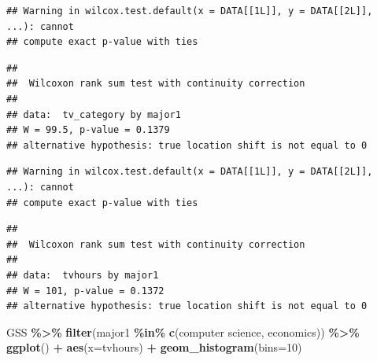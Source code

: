 \documentclass[
]{book}
\newenvironment{Shaded}{\begin{snugshade}}{\end{snugshade}}
\newcommand{\AttributeTok}[1]{\textcolor[rgb]{0.13,0.29,0.53}{#1}}
\newcommand{\DecValTok}[1]{\textcolor[rgb]{0.00,0.00,0.81}{#1}}
\newcommand{\FunctionTok}[1]{\textcolor[rgb]{0.13,0.29,0.53}{\textbf{#1}}}
\newcommand{\NormalTok}[1]{#1}
\newcommand{\SpecialCharTok}[1]{\textcolor[rgb]{0.81,0.36,0.00}{\textbf{#1}}}
\newcommand{\StringTok}[1]{\textcolor[rgb]{0.31,0.60,0.02}{#1}}
\theoremstyle{definition}
\theoremstyle{definition}
\theoremstyle{definition}
\theoremstyle{definition}
\theoremstyle{remark}
\begin{document}
\begin{verbatim}
## Warning in wilcox.test.default(x = DATA[[1L]], y = DATA[[2L]], ...): cannot
## compute exact p-value with ties
\end{verbatim}

\begin{verbatim}
## 
##  Wilcoxon rank sum test with continuity correction
## 
## data:  tv_category by major1
## W = 99.5, p-value = 0.1379
## alternative hypothesis: true location shift is not equal to 0
\end{verbatim}

\begin{Shaded}
\end{Shaded}

\begin{verbatim}
## Warning in wilcox.test.default(x = DATA[[1L]], y = DATA[[2L]], ...): cannot
## compute exact p-value with ties
\end{verbatim}

\begin{verbatim}
## 
##  Wilcoxon rank sum test with continuity correction
## 
## data:  tvhours by major1
## W = 101, p-value = 0.1372
## alternative hypothesis: true location shift is not equal to 0
\end{verbatim}

\begin{Shaded}
\begin{Highlighting}[]
\NormalTok{GSS }\SpecialCharTok{\%\textgreater{}\%} 
  \FunctionTok{filter}\NormalTok{(major1 }\SpecialCharTok{\%in\%} \FunctionTok{c}\NormalTok{(}\StringTok{\textquotesingle{}computer science\textquotesingle{}}\NormalTok{, }\StringTok{\textquotesingle{}economics\textquotesingle{}}\NormalTok{)) }\SpecialCharTok{\%\textgreater{}\%} 
  \FunctionTok{ggplot}\NormalTok{() }\SpecialCharTok{+} 
  \FunctionTok{aes}\NormalTok{(}\AttributeTok{x=}\NormalTok{tvhours) }\SpecialCharTok{+} 
  \FunctionTok{geom\_histogram}\NormalTok{(}\AttributeTok{bins=}\DecValTok{10}\NormalTok{)}
\end{Highlighting}
\end{Shaded}
\end{document}
